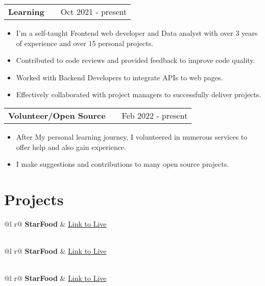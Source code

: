 \documentclass[a4paper,12pt]{article}
\makeatletter
\newenvironment{joblong}[2]
    {
    \begin{tabularx}{\linewidth}{@{}l X r@{}}
    \textbf{#1} & \hfill &  #2 \\[3.75pt]
    \end{tabularx}
    \begin{minipage}[t]{\linewidth}
    \begin{itemize}[nosep,after=\strut, leftmargin=1em, itemsep=3pt,label=--]
    }
    {
    \end{itemize}
    \end{minipage}    
    }
\makeatother
\begin{document}
\begin{joblong}{Learning}{Oct 2021 - present}
\item I'm a self-taught Frontend web developer and Data analyst with over 3 years of experience and over 15 personal projects. 
\item Contributed to code reviews and provided feedback to improve code quality.
\item Worked with Backend Developers to integrate APIs to web pages.
\item Effectively collaborated with project managers to successfully deliver projects.
\end{joblong}

\begin{joblong}{Volunteer/Open Source}{Feb 2022 - present}
\item After My personal learning journey, I volunteered in numerous services to offer help and also gain experience.
\item I make suggestions and contributions to many open source projects. 
\end{joblong}

\section{Projects}

\begin{tabularx}{\linewidth}{ @{}l r@{} }
\textbf{StarFood} & \hfill \href{https://harbystardev.github.io/StarMart/}{Link to Live} \\[3.75pt]
  \\
\end{tabularx}

\begin{tabularx}{\linewidth}{ @{}l r@{} }
\textbf{StarFood} & \hfill \href{https://harbystardev.github.io/StarBank/}{Link to Live} \\[3.75pt]
  \\
\end{tabularx}

\begin{tabularx}{\linewidth}{ @{}l r@{} }
\textbf{StarFood} & \hfill \href{https://harbystardev.github.io/StarCare/}{Link to Live} \\[3.75pt]
  \\
\end{tabularx}
\end{document}
